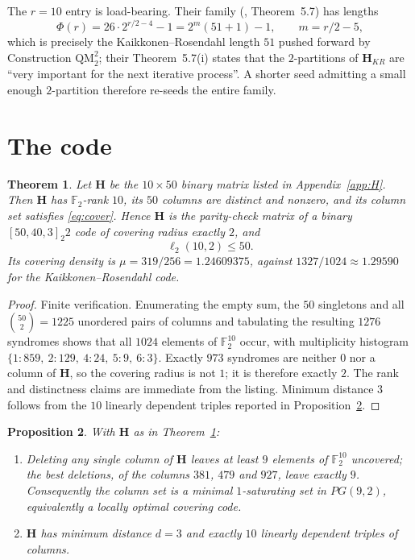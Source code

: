 \documentclass[11pt,a4paper]{article}
\newtheorem{theorem}{Theorem}
\newtheorem{proposition}[theorem]{Proposition}
\theoremstyle{definition}
\theoremstyle{remark}
\newcommand{\FF}{\mathbb{F}}
\newcommand{\HH}{\boldsymbol{H}}
\begin{document}
The $r=10$ entry is load-bearing. Their family (\cite{DMP2025}, Theorem~5.7)
has lengths
\[
\Phi(r)=26\cdot2^{r/2-4}-1=2^{m}(51+1)-1,\qquad m=r/2-5,
\]
which is precisely the Kaikkonen--Rosendahl length $51$ pushed forward by
Construction $\mathrm{QM}_2^2$; their Theorem~5.7(i) states that the
$2$-partitions of $\HH_{KR}$ are ``very important for the next iterative
process''. A shorter seed admitting a small enough $2$-partition therefore
re-seeds the entire family.

\section{The code}

\begin{theorem}\label{thm:main}
Let $\HH$ be the $10\times50$ binary matrix listed in Appendix~\ref{app:H}.
Then $\HH$ has $\FF_2$-rank $10$, its $50$ columns are distinct and nonzero,
and its column set satisfies \eqref{eq:cover}. Hence $\HH$ is the parity-check
matrix of a binary $[50,40,3]_2 2$ code of covering radius exactly $2$, and
\[
\ell_2(10,2)\le 50 .
\]
Its covering density is $\mu=319/256=1.24609375$, against
$1327/1024\approx1.29590$ for the Kaikkonen--Rosendahl code.
\end{theorem}

\begin{proof}
Finite verification. Enumerating the empty sum, the $50$ singletons and all
$\binom{50}{2}=1225$ unordered pairs of columns and tabulating the resulting
$1276$ syndromes shows that all $1024$ elements of $\FF_2^{10}$ occur, with
multiplicity histogram
$\{1{:}859,\ 2{:}129,\ 4{:}24,\ 5{:}9,\ 6{:}3\}$.
Exactly $973$ syndromes are neither $0$ nor a column of $\HH$, so the covering
radius is not $1$; it is therefore exactly $2$. The rank and distinctness
claims are immediate from the listing. Minimum distance $3$ follows from the
$10$ linearly dependent triples reported in Proposition~\ref{prop:aux}.
\end{proof}

\begin{proposition}\label{prop:aux}
With $\HH$ as in Theorem~\ref{thm:main}:
\begin{enumerate}
\item[(i)] Deleting any single column of $\HH$ leaves at least $9$ elements of
$\FF_2^{10}$ uncovered; the best deletions, of the columns $381$, $479$ and
$927$, leave exactly $9$. Consequently the column set is a minimal
$1$-saturating set in $PG(9,2)$, equivalently a locally optimal covering code.
\item[(ii)] $\HH$ has minimum distance $d=3$ and exactly $10$ linearly
dependent triples of columns.
\end{enumerate}
\end{proposition}
\end{document}
